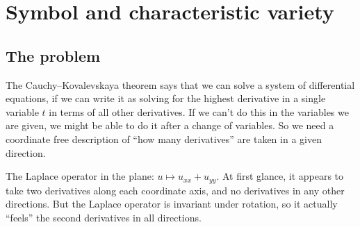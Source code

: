 \chapter{Symbol and characteristic variety}\label{chapter:characteristics}%
\section{The problem}
The Cauchy--Kovalevskaya theorem says that we can solve a system of differential equations, if we can write it as solving for the highest derivative in a single variable \(t\) in terms of all other derivatives.
If we can't do this in the variables we are given, we might be able to do it after a change of variables. 
So we need a coordinate free description of ``how many derivatives'' are taken in a given direction.
\begin{example}The Laplace operator in the plane: \(u \mapsto u_{xx}+u_{yy}\).
At first glance, it appears to take two derivatives along each coordinate axis, and no derivatives in any other directions.
But the Laplace operator is invariant under rotation, so it actually ``feels'' the second derivatives in all directions.
\end{example}

